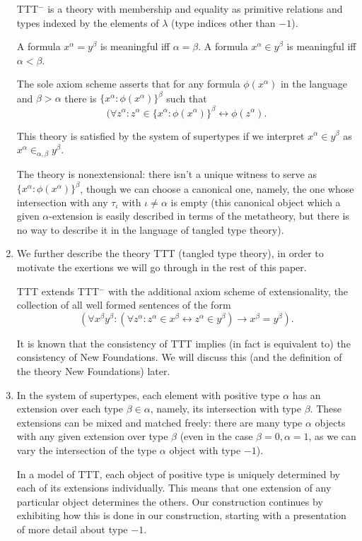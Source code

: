\documentclass[12pt]{article}
\begin{document}
\begin{enumerate}
TTT$^-$ is a theory with membership and equality as primitive relations and types indexed by the elements of $\lambda$ (type indices other than $-1$).

A formula $x^\alpha = y^\beta$ is meaningful iff $\alpha=\beta$.  A formula $x^\alpha \in y^\beta$ is meaningful iff $\alpha<\beta$.

The sole axiom scheme asserts that for any formula $\phi(x^\alpha)$ in the language and $\beta>\alpha$ there is $\{x^\alpha:\phi(x^\alpha)\}^\beta$ such that
$$(\forall z^\alpha:z^\alpha \in \{x^\alpha:\phi(x^\alpha)\}^\beta \leftrightarrow \phi(z^\alpha).$$

This theory is satisfied by the system of supertypes if we interpret $x^\alpha \in y^\beta$ as $x^\alpha \in_{\alpha,\beta} y^\beta$.

The theory is nonextensional:  there isn't a unique witness to serve as $\{x^\alpha:\phi(x^\alpha)\}^\beta$, though we can choose a canonical one, namely, the one whose intersection
with any $\tau_\iota$ with $\iota \neq \alpha$ is empty (this canonical object which a given $\alpha$-extension is easily described in terms of the metatheory, but there is no way to describe it in the language of tangled type theory).

\item We further describe the theory TTT (tangled type theory), in order to motivate the exertions we will go through in the rest of this paper.

TTT extends TTT$^-$ with the additional axiom scheme of extensionality, the collection of all well formed sentences of the form $$(\forall x^\beta y^\beta:(\forall z^\alpha:z^\alpha \in x^\beta \leftrightarrow z^\alpha \in y^\beta)\rightarrow x^\beta=y^\beta).$$

It is known that the consistency of TTT implies (in fact is equivalent to) the consistency of New Foundations.  We will discuss this (and the definition of the theory New Foundations)  later.

\item In the system of supertypes, each element with positive type $\alpha$ has an extension over each type $\beta\in \alpha$, namely, its intersection with type $\beta$.  These extensions can be mixed and matched freely:  there are many type $\alpha$ objects with any given extension over type $\beta$ (even in the case $\beta=0, \alpha=1$, as we can vary the intersection of
the type $\alpha$ object with type $-1$).

 In a model of TTT, each object of positive type is uniquely determined by each of its extensions individually.  This means that one extension of any particular object determines the others.
Our construction continues by exhibiting how this is done in our construction, starting with a presentation of more detail about type $-1$.


\end{enumerate}
\end{document}
